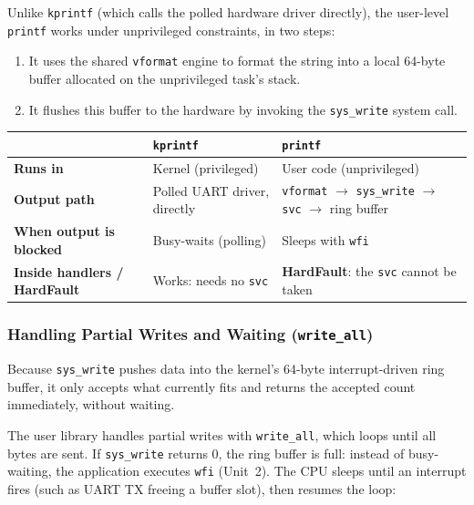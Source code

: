 Unlike \texttt{kprintf} (which calls the polled hardware driver directly), the user-level \texttt{printf} works under unprivileged constraints, in two steps:
\begin{enumerate}
    \item It uses the shared \texttt{vformat} engine to format the string into a local 64-byte buffer allocated on the unprivileged task's stack.
    \item It flushes this buffer to the hardware by invoking the \texttt{sys\_write} system call.
\end{enumerate}

\begin{table}[h!]
    \centering
    \small
    \begin{tabular}{p{3.4cm} p{4.6cm} p{4.6cm}}
        \toprule
        & \textbf{\texttt{kprintf}} & \textbf{\texttt{printf}} \\
        \midrule
        \textbf{Runs in} & Kernel (privileged) & User code (unprivileged) \\
        \textbf{Output path} & Polled UART driver, directly & \texttt{vformat} $\rightarrow$ \texttt{sys\_write} $\rightarrow$ \texttt{svc} $\rightarrow$ ring buffer \\
        \textbf{When output is blocked} & Busy-waits (polling) & Sleeps with \texttt{wfi} \\
        \textbf{Inside handlers / HardFault} & Works: needs no \texttt{svc} & \textbf{HardFault}: the \texttt{svc} cannot be taken \\
        \bottomrule
    \end{tabular}
\end{table}

\subsubsection{Handling Partial Writes and Waiting (\texttt{write\_all})}
Because \texttt{sys\_write} pushes data into the kernel's 64-byte interrupt-driven ring buffer, it only accepts what currently fits and returns the accepted count immediately, without waiting.

The user library handles partial writes with \texttt{write\_all}, which loops until all bytes are sent. If \texttt{sys\_write} returns 0, the ring buffer is full: instead of busy-waiting, the application executes \texttt{wfi} (Unit~2). The CPU sleeps until an interrupt fires (such as UART TX freeing a buffer slot), then resumes the loop:

